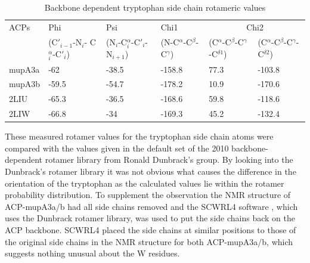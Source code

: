 	\begin{table}[htbp]
	\caption{Backbone dependent tryptophan side chain rotameric values}
	\begin{center}
	\begin{tabular}{p{1.5cm}p{1.5cm}p{1.5cm}p{1.5cm}p{1.5cm}p{1.5cm}}
	
		\toprule[2pt]
		ACPs & \multicolumn{1}{l}{Phi} & \multicolumn{1}{l}{Psi} & \multicolumn{1}{l}{Chi1} & \multicolumn{ 2}{c}{Chi2}   \\
	         & \multicolumn{1}{l}{\tiny(C$'_{i-1}$-N$_{i}$- C$^{\alpha}_{i}$-C$'_{i}$)} & \multicolumn{1}{l}{\tiny(N$_{i}$-C$^{\alpha}_{i}$-C$'_{i}$-N$_{i+1}$)} & \multicolumn{1}{l}{\tiny(N-C$^{\alpha}$-C$ ^{\beta} $-C$^{\gamma}$)} & \multicolumn{1}{l}{\tiny(C$^{\alpha}$-C$^{\beta}$-C$^{\gamma}$-C$^{\delta1}$)} & \multicolumn{1}{l}{\tiny(C$^{\alpha}$-C$^{\beta}$-C$^{\gamma}$-C$^{\delta2}$)} \\ \midrule[1pt]
	  mupA3a & -62   & -38.5 & -158.8 & 77.3 & -103.8  \\
	  mupA3b & -59.5 & -54.7 & -178.2 & 10.9 & -170.6  \\
	  2LIU   & -65.3 & -36.5 & -168.6 & 59.8 & -118.6  \\
	  2LIW   & -66.8 & -34   & -169.3 & 45.2 & -132.4  \\ \bottomrule[2pt]
	\end{tabular}
	\end{center}
	\label{tab:RotamericValue}
	\end{table}
			
	These measured rotamer values for the tryptophan side chain atoms were compared with the values given in the default set of the 2010 backbone-dependent rotamer library \parencite{Shapovalov2011} from Ronald Dunbrack's group. By looking into the Dunbrack’s rotamer library it was not obvious what causes the difference in the orientation of the tryptophan as the calculated values lie within the rotamer probability distribution. To supplement the observation the NMR structure of ACP-mupA3a/b had all side chains removed and the SCWRL4 software \parencite{Krivov2009}, which uses the Dunbrack rotamer library, was used to put the side chains back on the ACP backbone. SCWRL4 placed the side chains at similar positions to those of the original side chains in the NMR structure for both ACP-mupA3a/b, which suggests nothing unusual about the W residues.
	
